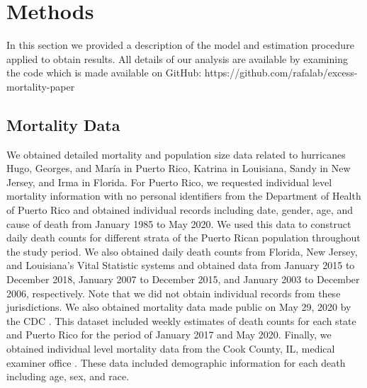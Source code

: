 \documentclass[11pt]{article}
\begin{document}
\section{Methods}
\label{sec:methods}

In this section we provided a description of the model and estimation procedure applied to obtain results. All details of our analysis are available by examining the code which is made available on GitHub: https://github.com/rafalab/excess-mortality-paper

\subsection{Mortality Data}
\label{subsec:mortality-data}
We obtained detailed mortality and population size data related to hurricanes Hugo, Georges, and Mar\'ia in Puerto Rico, Katrina in Louisiana, Sandy in New Jersey, and Irma in Florida. For Puerto Rico, we requested individual level mortality information with no personal identifiers from the Department of Health of Puerto Rico and obtained individual records including date, gender, age, and cause of death from January 1985 to May 2020. We used this data to construct daily death counts for different strata of the Puerto Rican population throughout the study period. We also obtained daily death counts from Florida, New Jersey, and Louisiana’s Vital Statistic systems and obtained data from January 2015 to December 2018, January 2007 to December 2015, and January 2003 to December 2006, respectively. Note that we did not obtain individual records from these jurisdictions. We also obtained mortality data made public on May 29, 2020 by the CDC  \cite{cdc2020covid19}. This dataset included weekly estimates of death counts for each state and Puerto Rico for the period of January 2017 and May 2020. 
Finally, we obtained individual level mortality data from the Cook County, IL, medical examiner office \cite{cookcovid19}. These data included demographic information for each death including age, sex, and race.
\end{document}
